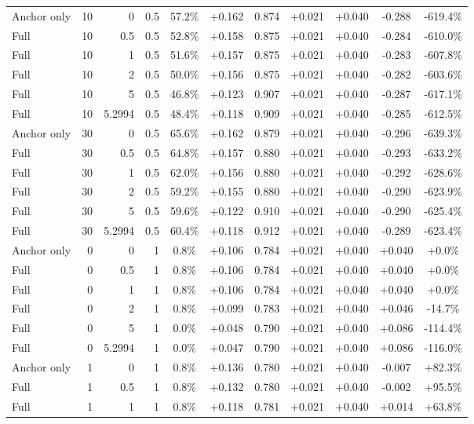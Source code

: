 \begin{table}[htbp]
\begin{tabular}{lrrrccccccc}
Anchor only & 10 & 0 & 0.5 & 57.2\% & +0.162 & 0.874 & +0.021 & +0.040 & -0.288 & -619.4\% \\
Full & 10 & 0.5 & 0.5 & 52.8\% & +0.158 & 0.875 & +0.021 & +0.040 & -0.284 & -610.0\% \\
Full & 10 & 1 & 0.5 & 51.6\% & +0.157 & 0.875 & +0.021 & +0.040 & -0.283 & -607.8\% \\
Full & 10 & 2 & 0.5 & 50.0\% & +0.156 & 0.875 & +0.021 & +0.040 & -0.282 & -603.6\% \\
Full & 10 & 5 & 0.5 & 46.8\% & +0.123 & 0.907 & +0.021 & +0.040 & -0.287 & -617.1\% \\
Full & 10 & 5.2994 & 0.5 & 48.4\% & +0.118 & 0.909 & +0.021 & +0.040 & -0.285 & -612.5\% \\
Anchor only & 30 & 0 & 0.5 & 65.6\% & +0.162 & 0.879 & +0.021 & +0.040 & -0.296 & -639.3\% \\
Full & 30 & 0.5 & 0.5 & 64.8\% & +0.157 & 0.880 & +0.021 & +0.040 & -0.293 & -633.2\% \\
Full & 30 & 1 & 0.5 & 62.0\% & +0.156 & 0.880 & +0.021 & +0.040 & -0.292 & -628.6\% \\
Full & 30 & 2 & 0.5 & 59.2\% & +0.155 & 0.880 & +0.021 & +0.040 & -0.290 & -623.9\% \\
Full & 30 & 5 & 0.5 & 59.6\% & +0.122 & 0.910 & +0.021 & +0.040 & -0.290 & -625.4\% \\
Full & 30 & 5.2994 & 0.5 & 60.4\% & +0.118 & 0.912 & +0.021 & +0.040 & -0.289 & -623.4\% \\
Anchor only & 0 & 0 & 1 & 0.8\% & +0.106 & 0.784 & +0.021 & +0.040 & +0.040 & +0.0\% \\
Full & 0 & 0.5 & 1 & 0.8\% & +0.106 & 0.784 & +0.021 & +0.040 & +0.040 & +0.0\% \\
Full & 0 & 1 & 1 & 0.8\% & +0.106 & 0.784 & +0.021 & +0.040 & +0.040 & +0.0\% \\
Full & 0 & 2 & 1 & 0.8\% & +0.099 & 0.783 & +0.021 & +0.040 & +0.046 & -14.7\% \\
Full & 0 & 5 & 1 & 0.0\% & +0.048 & 0.790 & +0.021 & +0.040 & +0.086 & -114.4\% \\
Full & 0 & 5.2994 & 1 & 0.0\% & +0.047 & 0.790 & +0.021 & +0.040 & +0.086 & -116.0\% \\
Anchor only & 1 & 0 & 1 & 0.8\% & +0.136 & 0.780 & +0.021 & +0.040 & -0.007 & +82.3\% \\
Full & 1 & 0.5 & 1 & 0.8\% & +0.132 & 0.780 & +0.021 & +0.040 & -0.002 & +95.5\% \\
Full & 1 & 1 & 1 & 0.8\% & +0.118 & 0.781 & +0.021 & +0.040 & +0.014 & +63.8\% \\

\end{tabular}
\end{table}
